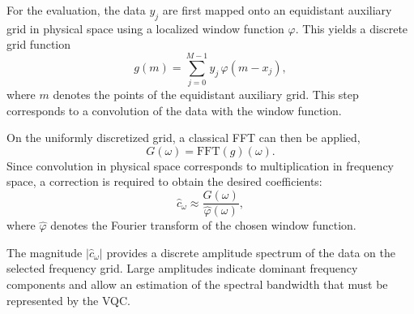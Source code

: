 For the evaluation, the data $y_j$
are first mapped onto an equidistant auxiliary grid in physical space
using a localized window function
$\varphi$.
This yields a discrete grid function
\begin{equation}
g(m)
=
\sum_{j=0}^{M-1}
y_j \, \varphi(m - x_j),
\end{equation}
where $m$ denotes the points of the equidistant auxiliary grid.
This step corresponds to a convolution of the data with the window function.

On the uniformly discretized grid, a classical FFT can then be applied,
\begin{equation}
G(\omega) = \mathrm{FFT}(g)(\omega).
\end{equation}
Since convolution in physical space corresponds to multiplication in
frequency space, a correction is required to obtain the desired coefficients:
\begin{equation}
\hat{c}_\omega
\approx
\frac{G(\omega)}{\hat{\varphi}(\omega)},
\end{equation}
where $\hat{\varphi}$ denotes the Fourier transform
of the chosen window function.

The magnitude $|\hat{c}_\omega|$ provides a discrete amplitude spectrum of the data on the selected frequency grid.
Large amplitudes indicate dominant frequency components and allow an estimation of the spectral bandwidth that must be represented by the VQC.